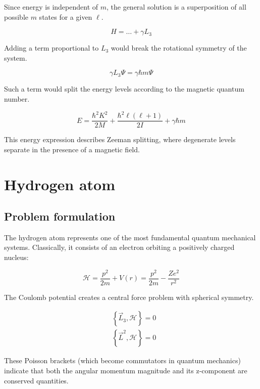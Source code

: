 \documentclass[italian]{HKNdocument}
\begin{document}
Since energy is independent of $m$, the general solution is a superposition of all possible $m$ states for a given $\ell$.

\begin{equation}
H=\ldots+\gamma L_{3} \label{eq:8.80}
\end{equation}

Adding a term proportional to $L_3$ would break the rotational symmetry of the system.

\begin{equation}
\gamma L_{3} \Psi=\gamma \hbar m \Psi \label{eq:8.81}
\end{equation}

Such a term would split the energy levels according to the magnetic quantum number.

\begin{equation}
E=\frac{\hbar^{2} K^{2}}{2 M}+\frac{\hbar^{2} \ell(\ell+1)}{2 I}+\gamma \hbar m \label{eq:8.82}
\end{equation}

This energy expression describes Zeeman splitting, where degenerate levels separate in the presence of a magnetic field.

\section{Hydrogen atom}
\subsection{Problem formulation}
The hydrogen atom represents one of the most fundamental quantum mechanical systems. Classically, it consists of an electron orbiting a positively charged nucleus:

\begin{equation}
\mathcal{H}=\frac{p^{2}}{2 m}+V(r)=\frac{p^{2}}{2 m}-\frac{Z e^{2}}{r^{2}} \label{eq:9.1}
\end{equation}

The Coulomb potential creates a central force problem with spherical symmetry.

\begin{align}
& \left\{\vec{L}_{3}, \mathcal{H}\right\}=0 \\
& \left\{\vec{L}^{2}, \mathcal{H}\right\}=0 \label{eq:9.2}
\end{align}

These Poisson brackets (which become commutators in quantum mechanics) indicate that both the angular momentum magnitude and its z-component are conserved quantities.
\end{document}
